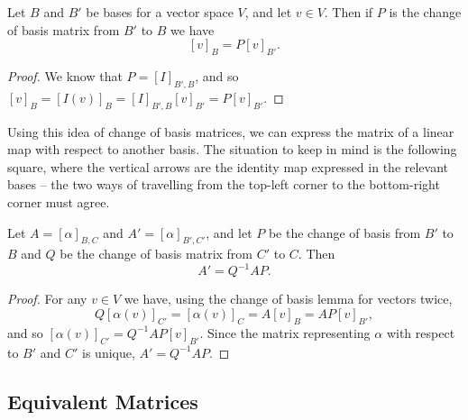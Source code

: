 \begin{lemma}
    Let $B$ and $B'$ be bases for a vector space $V$, and let $v \in V$. Then if $P$ is the change of basis matrix from $B'$ to $B$ we have
    $$
    [v]_{B} = P[v]_{B'}.
    $$
\end{lemma}
\begin{proof}
    We know that $P = [I]_{B', B}$, and so $[v]_B = [I(v)]_B = [I]_{B', B} [v]_{B'} = P[v]_{B'}$.
\end{proof}

Using this idea of change of basis matrices, we can express the matrix of a linear map with respect to another basis. The situation to keep in mind is the following square, where the vertical arrows are the identity map expressed in the relevant bases -- the two ways of travelling from the top-left corner to the bottom-right corner must agree.
\begin{center}
\end{center}

\begin{proposition}
    Let $A = [\alpha]_{B, C}$ and $A' = [\alpha]_{B', C'}$, and let $P$ be the change of basis from $B'$ to $B$ and $Q$ be the change of basis matrix from $C'$ to $C$. Then
    $$
    A' = Q^{-1} AP.
    $$
\end{proposition}
\begin{proof}
    For any $v \in V$ we have, using the change of basis lemma for vectors twice,
    $$
    Q [\alpha(v)]_{C'} = [\alpha(v)]_C = A [v]_B = AP[v]_{B'},
    $$
    and so $[\alpha(v)]_{C'} = Q^{-1}AP [v]_{B'}$. Since the matrix representing $\alpha$ with respect to $B'$ and $C'$ is unique, $A' = Q^{-1}AP$.
\end{proof}

\subsection{Equivalent Matrices}

